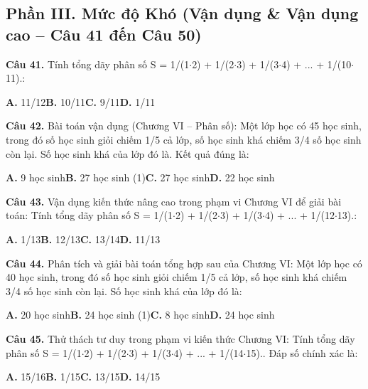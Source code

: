 \documentclass[11pt,a4paper]{article}
\begin{document}
\subsection*{\color{accent} Phần III. Mức độ Khó (Vận dụng \& Vận dụng cao -- Câu 41 đến Câu 50)}
\textbf{\color{primary} Câu 41.} Tính tổng dãy phân số S = 1/(1$\cdot$2) + 1/(2$\cdot$3) + 1/(3$\cdot$4) + ... + 1/(10$\cdot$11).:\par
\hspace*{1.5em}\textbf{A.} 11/12\quad\quad \textbf{B.} 10/11\quad\quad \textbf{C.} 9/11\quad\quad \textbf{D.} 1/11\par\vspace{2pt}
\textbf{\color{primary} Câu 42.} Bài toán vận dụng (Chương VI – Phân số): Một lớp học có 45 học sinh, trong đó số học sinh giỏi chiếm 1/5 cả lớp, số học sinh khá chiếm 3/4 số học sinh còn lại. Số học sinh khá của lớp đó là. Kết quả đúng là:\par
\hspace*{1.5em}\textbf{A.} 9 học sinh\quad\quad \textbf{B.} 27 học sinh (1)\quad\quad \textbf{C.} 27 học sinh\quad\quad \textbf{D.} 22 học sinh\par\vspace{2pt}
\textbf{\color{primary} Câu 43.} Vận dụng kiến thức nâng cao trong phạm vi Chương VI để giải bài toán: Tính tổng dãy phân số S = 1/(1$\cdot$2) + 1/(2$\cdot$3) + 1/(3$\cdot$4) + ... + 1/(12$\cdot$13).:\par
\hspace*{1.5em}\textbf{A.} 1/13\quad\quad \textbf{B.} 12/13\quad\quad \textbf{C.} 13/14\quad\quad \textbf{D.} 11/13\par\vspace{2pt}
\textbf{\color{primary} Câu 44.} Phân tích và giải bài toán tổng hợp sau của Chương VI: Một lớp học có 40 học sinh, trong đó số học sinh giỏi chiếm 1/5 cả lớp, số học sinh khá chiếm 3/4 số học sinh còn lại. Số học sinh khá của lớp đó là:\par
\hspace*{1.5em}\textbf{A.} 20 học sinh\quad\quad \textbf{B.} 24 học sinh (1)\quad\quad \textbf{C.} 8 học sinh\quad\quad \textbf{D.} 24 học sinh\par\vspace{2pt}
\textbf{\color{primary} Câu 45.} Thử thách tư duy trong phạm vi kiến thức Chương VI: Tính tổng dãy phân số S = 1/(1$\cdot$2) + 1/(2$\cdot$3) + 1/(3$\cdot$4) + ... + 1/(14$\cdot$15).. Đáp số chính xác là:\par
\hspace*{1.5em}\textbf{A.} 15/16\quad\quad \textbf{B.} 1/15\quad\quad \textbf{C.} 13/15\quad\quad \textbf{D.} 14/15\par\vspace{2pt}
\end{document}
